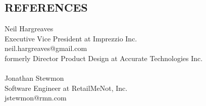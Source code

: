 \documentclass[line,margin]{res}
\begin{document}
\begin{resume}
\section{\textcolor{HeaderColor}{REFERENCES}}
    Neil Hargreaves\\
    Executive Vice President at Imprezzio Inc.\\
    neil.hargreaves@gmail.com\\
    formerly Director Product Design at Accurate Technologies Inc.\\
\\
    Jonathan Stewmon\\
    Software Engineer at RetailMeNot, Inc.\\
    jstewmon@rmn.com\\
 

\end{resume}
\end{document}
